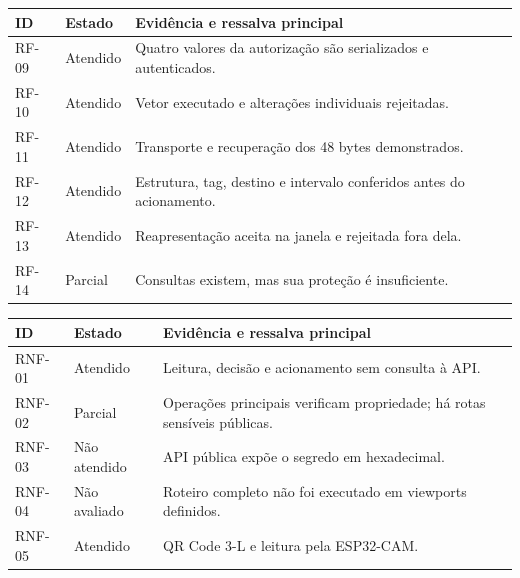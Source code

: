 \begin{quadro}[htbp]
    \caption{Resultados de RF-09 a RF-14}
    \label{qua:resultados-rf-credencial}
    \small
    \begin{tabular}{|p{}|p{}|p{}|}
        \hline
        \textbf{ID} & \textbf{Estado} & \textbf{Evidência e ressalva principal} \\ \hline
        RF-09 & Atendido & Quatro valores da autorização são serializados e autenticados. \\ \hline
        RF-10 & Atendido & Vetor executado e alterações individuais rejeitadas. \\ \hline
        RF-11 & Atendido & Transporte e recuperação dos 48 bytes demonstrados. \\ \hline
        RF-12 & Atendido & Estrutura, tag, destino e intervalo conferidos antes do acionamento. \\ \hline
        RF-13 & Atendido & Reapresentação aceita na janela e rejeitada fora dela. \\ \hline
        RF-14 & Parcial & Consultas existem, mas sua proteção é insuficiente. \\ \hline
    \end{tabular}
\end{quadro}

\begin{quadro}[htbp]
    \caption{Resultados dos requisitos não funcionais}
    \label{qua:resultados-rnf}
    \small
    \begin{tabular}{|p{}|p{}|p{}|}
        \hline
        \textbf{ID} & \textbf{Estado} & \textbf{Evidência e ressalva principal} \\ \hline
        RNF-01 & Atendido & Leitura, decisão e acionamento sem consulta à API. \\ \hline
        RNF-02 & Parcial & Operações principais verificam propriedade; há rotas sensíveis públicas. \\ \hline
        RNF-03 & Não atendido & API pública expõe o segredo em hexadecimal. \\ \hline
        RNF-04 & Não avaliado & Roteiro completo não foi executado em viewports definidos. \\ \hline
        RNF-05 & Atendido & QR Code 3-L e leitura pela ESP32-CAM. \\ \hline
    \end{tabular}
\end{quadro}

